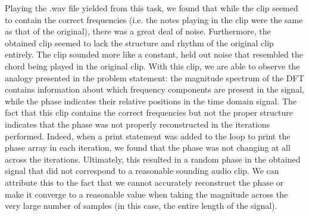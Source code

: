 \documentclass[letterpaper,twocolumn,10pt]{article}
\begin{document}
\vspace{3mm}
Playing the .wav file yielded from this task, we found that while the clip seemed to contain the correct frequencies (i.e. the notes playing in the clip were the same as that of the original), there was a great deal of noise. Furthermore, the obtained clip seemed to lack the structure and rhythm of the original clip entirely. The clip sounded more like a constant, held out noise that resembled the chord being played in the original clip. \hspace*{\fill}
\vspace{4mm}
\linebreak
With this clip, we are able to observe the analogy presented in the problem statement: the magnitude spectrum of the DFT contains information about which frequency components are present in the signal, while the phase indicates their relative positions in the time domain signal. The fact that this clip contains the correct frequencies but not the proper structure indicates that the phase was not properly reconstructed in the iterations performed. Indeed, when a print statement was added to the loop to print the phase array in each iteration, we found that the phase was not changing at all across the iterations. Ultimately, this resulted in a random phase in the obtained signal that did not correspond to a reasonable sounding audio clip. We can attribute this to the fact that we cannot accurately reconstruct the phase or make it converge to a reasonable value when taking the magnitude across the very large number of samples (in this case, the entire length of the signal).\hspace*{\fill}
\end{document}
